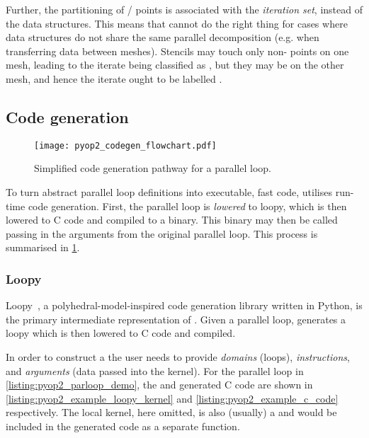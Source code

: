 \documentclass[thesis]{subfiles}
\begin{document}
Further, the partitioning of \coreiter{}/\ownediter{} points is associated with the \emph{iteration set}, instead of the data structures.
This means that  cannot do the right thing for cases where data structures do not share the same parallel decomposition (e.g. when transferring data between meshes).
  Stencils may touch only non-\ghostiter{} points on one mesh, leading to the iterate being classified as \coreiter{}, but they may be \ghostiter{} on the other mesh, and hence the iterate ought to be labelled \ownediter{}.

\subsection{Code generation}
\label{sec:pyop2_codegen}

\begin{figure}
  \texttt{[image: pyop2\_codegen\_flowchart.pdf]}
  \caption{Simplified code generation pathway for a  parallel loop.}
  \label{fig:pyop2_codegen}
\end{figure}

To turn abstract parallel loop definitions into executable, fast code,  utilises run-time code generation.
First, the parallel loop is \emph{lowered} to loopy, which is then lowered to C code and compiled to a binary.
This binary may then be called passing in the arguments from the original parallel loop.
This process is summarised in \cref{fig:pyop2_codegen}.

\subsubsection{Loopy}

Loopy~\cite{klocknerLooPyTransformationbased2014}, a polyhedral-model-inspired code generation library written in Python, is the primary intermediate representation of .
Given a parallel loop,  generates a loopy  which is then lowered to C code and compiled.

In order to construct a  the user needs to provide \emph{domains} (loops), \emph{instructions}, and \emph{arguments} (data passed into the kernel).
For the parallel loop in \cref{listing:pyop2_parloop_demo}, the  and generated C code are shown in \cref{listing:pyop2_example_loopy_kernel} and \cref{listing:pyop2_example_c_code} respectively.
The local kernel, here omitted, is also (usually) a  and would be included in the generated code as a separate function.
\end{document}

